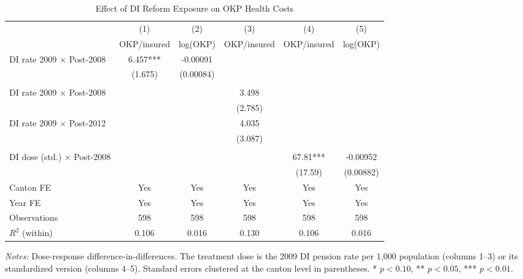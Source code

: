 \begin{table}[H]
\centering
\caption{Effect of DI Reform Exposure on OKP Health Costs}
\begin{adjustbox}{max width=\textwidth}
\begin{tabular}{lccccc}
\toprule
& (1) & (2) & (3) & (4) & (5) \\
& OKP/insured & log(OKP) & OKP/insured & OKP/insured & log(OKP) \\
\midrule
DI rate 2009 $\times$ Post-2008 & 6.457*** & -0.00091 & & & \\
& (1.675) & (0.00084) & & & \\
\\
DI rate 2009 $\times$ Post-2008 & & & 3.498 & & \\
& & & (2.785) & & \\
DI rate 2009 $\times$ Post-2012 & & & 4.035 & & \\
& & & (3.087) & & \\
\\
DI dose (std.) $\times$ Post-2008 & & & & 67.81*** & -0.00952 \\
& & & & (17.59) & (0.00882) \\
\midrule
Canton FE & Yes & Yes & Yes & Yes & Yes \\
Year FE & Yes & Yes & Yes & Yes & Yes \\
Observations & 598 & 598 & 598 & 598 & 598 \\
$R^2$ (within) & 0.106 & 0.016 & 0.130 & 0.106 & 0.016 \\
\bottomrule
\end{tabular}
\end{adjustbox}
\vspace{0.3em}
\parbox{\textwidth}{\footnotesize \textit{Notes:} Dose-response difference-in-differences. The treatment dose is the 2009 DI pension rate per 1,000 population (columns 1--3) or its standardized version (columns 4--5). Standard errors clustered at the canton level in parentheses. * $p<0.10$, ** $p<0.05$, *** $p<0.01$.}
\label{tab:main}
\end{table}
